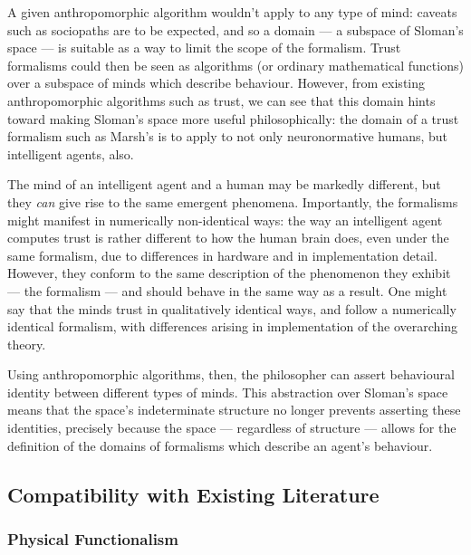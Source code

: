 A given anthropomorphic algorithm wouldn't apply to any type of mind: caveats such as sociopaths are to be expected, and so a domain --- a subspace of Sloman's space --- is suitable as a way to limit the scope of the formalism. Trust formalisms could then be seen as algorithms (or ordinary mathematical functions) over a subspace of minds which describe behaviour. However, from existing anthropomorphic algorithms such as trust, we can see that this domain hints toward making Sloman's space more useful philosophically: the domain of a trust formalism such as Marsh's is to apply to not only neuronormative humans, but intelligent agents, also.\par

The mind of an intelligent agent and a human may be markedly different, but they \emph{can} give rise to the same emergent phenomena. Importantly, the formalisms might manifest in numerically non-identical ways: the way an intelligent agent computes trust is rather different to how the human brain does, even under the same formalism, due to differences in hardware and in implementation detail. However, they conform to the same description of the phenomenon they exhibit --- the formalism --- and should behave in the same way as a result. One might say that the minds trust in qualitatively identical ways, and follow a numerically identical formalism, with differences arising in implementation of the overarching theory.\par

Using anthropomorphic algorithms, then, the philosopher can assert behavioural identity between different types of minds. This abstraction over Sloman's space means that the space's indeterminate structure no longer prevents asserting these identities, precisely because the space --- regardless of structure --- allows for the definition of the domains of formalisms which describe an agent's behaviour.\par

\subsection{Compatibility with Existing Literature}  %

\subsubsection{Physical Functionalism}  %
